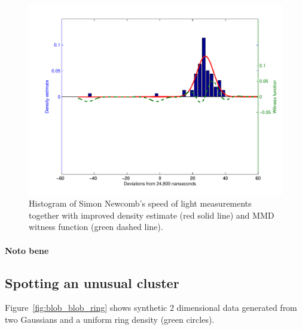 \documentclass{article}
\begin{document}
\begin{figure}[ht]
\centering
\includegraphics[width=0.98\columnwidth]{figures/newcomb_witness_2}
\caption{
Histogram of Simon Newcomb's speed of light measurements together with improved density estimate (red solid line) and MMD witness function (green dashed line).
}
\label{fig:newcomb_witness_1}
\end{figure}

\paragraph{Noto bene}

\subsection{Spotting an unusual cluster}

Figure~\ref{fig:blob_blob_ring} shows synthetic 2 dimensional data generated from two Gaussians and a uniform ring density (green circles).
\end{document}
